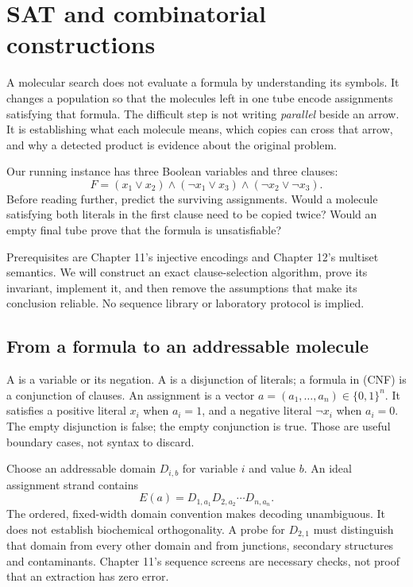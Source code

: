 \chapter{SAT and combinatorial constructions}
\label{ch:sat}
A molecular search does not evaluate a formula by understanding its symbols.
It changes a population so that the molecules left in one tube encode
assignments satisfying that formula. The difficult step is not writing
\emph{parallel} beside an arrow. It is establishing what each molecule means,
which copies can cross that arrow, and why a detected product is evidence
about the original problem.

Our running instance has three Boolean variables and three clauses:
\begin{equation}
 F=(x_1\lor x_2)\land(\neg x_1\lor x_3)
       \land(\neg x_2\lor\neg x_3).
 \label{eq:formula}
\end{equation}
Before reading further, predict the surviving assignments. Would a molecule
satisfying both literals in the first clause need to be copied twice? Would
an empty final tube prove that the formula is unsatisfiable?

Prerequisites are Chapter 11's injective encodings and Chapter 12's multiset
semantics. We will construct an exact clause-selection algorithm, prove its
invariant, implement it, and then remove the assumptions that make its
conclusion reliable. No sequence library or laboratory protocol is implied.

\section{From a formula to an addressable molecule}
A  is a variable or its negation. A  is a
disjunction of literals; a formula in  (CNF) is
a conjunction of clauses. An assignment is a vector
$a=(a_1,\ldots,a_n)\in\{0,1\}^n$. It satisfies a positive literal $x_i$
when $a_i=1$, and a negative literal $\neg x_i$ when $a_i=0$.
The empty disjunction is false; the empty conjunction is true. Those are
useful boundary cases, not syntax to discard.

Choose an addressable domain $D_{i,b}$ for variable $i$ and value $b$.
An ideal assignment strand contains
\begin{equation}
 E(a)=D_{1,a_1}D_{2,a_2}\cdots D_{n,a_n}.
\end{equation}
The ordered, fixed-width domain convention makes decoding unambiguous.
It does not establish biochemical orthogonality. A probe for $D_{2,1}$
must distinguish that domain from every other domain and from junctions,
secondary structures and contaminants. Chapter 11's sequence screens are
necessary checks, not proof that an extraction has zero error.

